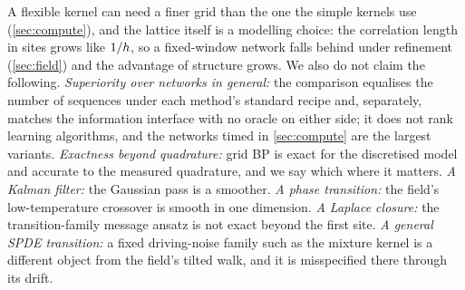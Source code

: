 A flexible kernel can need a finer grid than the one the simple kernels use (\cref{sec:compute}), and the lattice itself is a modelling choice:
the correlation length in sites grows like $1/h$, so a fixed-window network falls behind under refinement (\cref{sec:field}) and the
advantage of structure grows. We also do not claim the following.
\emph{Superiority over networks in general:} the comparison equalises the number of sequences under each method's standard recipe and,
separately, matches the information interface with no oracle on either side; it does not rank learning algorithms, and the networks
timed in \cref{sec:compute} are the largest variants.
\emph{Exactness beyond quadrature:} grid BP is exact for the discretised model and accurate to the measured quadrature, and we
say which where it matters.
\emph{A Kalman filter:} the Gaussian pass is a smoother.
\emph{A phase transition:} the field's low-temperature crossover is smooth in one dimension.
\emph{A Laplace closure:} the transition-family message ansatz is not exact beyond the first site.
\emph{A general SPDE transition:} a fixed driving-noise family such as the mixture kernel is a different object from the field's tilted walk, and
it is misspecified there through its drift.
